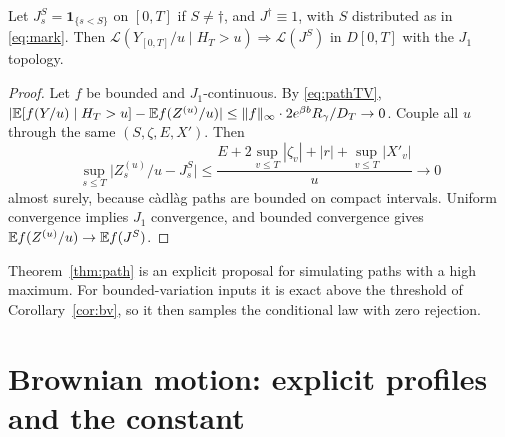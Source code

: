\documentclass[11pt,a4paper]{article}
\begin{document}
\begin{proposition}\label{prop:pathlimit}
Let $J^S_s=\mathbf 1_{\{s<S\}}$ on $[0,T]$ if $S\neq\dagger$, and $J^\dagger\equiv1$, with $S$ distributed as in \eqref{eq:mark}. Then $\mathcal L(Y_{[0,T]}/u\mid H_T>u)\Rightarrow\mathcal L(J^S)$ in $D[0,T]$ with the $J_1$ topology.
\end{proposition}

\begin{proof}
Let $f$ be bounded and $J_1$-continuous. By \eqref{eq:pathTV}, $|\mathbb E[f(Y/u)\mid H_T>u]-\mathbb E f(Z^{(u)}/u)|\le\|f\|_\infty\cdot2e^{\beta b}R_\gamma/D_T\to0$. Couple all $u$ through the same $(S,\zeta,E,X')$. Then
\[
 \sup_{s\le T}\big|Z^{(u)}_s/u-J^S_s\big|\le\frac{E+2\sup_{v\le T}|\zeta_v|+|r|+\sup_{v\le T}|X'_v|}{u}\longrightarrow0
\]
almost surely, because c\`adl\`ag paths are bounded on compact intervals. Uniform convergence implies $J_1$ convergence, and bounded convergence gives $\mathbb E f(Z^{(u)}/u)\to\mathbb E f(J^S)$.
\end{proof}

\begin{remark}
Theorem~\ref{thm:path} is an explicit proposal for simulating paths with a high maximum. For bounded-variation inputs it is exact above the threshold of Corollary~\ref{cor:bv}, so it then samples the conditional law with zero rejection.
\end{remark}

\section{Brownian motion: explicit profiles and the constant}\label{sec:brownian}
\end{document}
